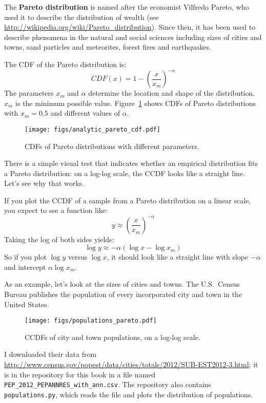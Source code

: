 \documentclass[12pt]{book}
\begin{document}
The {\bf Pareto distribution} is named after the economist Vilfredo Pareto,
who used it to describe the distribution of wealth (see
\url{http://wikipedia.org/wiki/Pareto_distribution}).  Since then, it
has been used to describe phenomena in the natural and social sciences
including sizes of cities and towns, sand particles and meteorites,
forest fires and earthquakes.  

The CDF of the Pareto distribution is:
%
\[ CDF(x) = 1 - \left( \frac{x}{x_m} \right) ^{-\alpha} \]
%
The parameters $x_{m}$ and $\alpha$ determine the location and shape
of the distribution. $x_{m}$ is the minimum possible value.
Figure~\ref{analytic_pareto_cdf} shows CDFs of Pareto
distributions with $x_{m} = 0.5$ and different values
of $\alpha$.

\begin{figure}
\centerline{\texttt{[image: figs/analytic\_pareto\_cdf.pdf]}}
\caption{CDFs of Pareto distributions with different parameters.}
\label{analytic_pareto_cdf}
\end{figure}

There is a simple visual test that indicates whether an empirical
distribution fits a Pareto distribution: on a log-log scale, the CCDF
looks like a straight line.  Let's see why that works.

If you plot the CCDF of a sample from a Pareto distribution on a
linear scale, you expect to see a function like:
%
\[ y \approx \left( \frac{x}{x_m} \right) ^{-\alpha} \]
%
Taking the log of both sides yields:
%
\[ \log y \approx -\alpha (\log x - \log x_{m})\]
%
So if you plot $\log y$ versus $\log x$, it should look like a straight
line with slope $-\alpha$ and intercept
$\alpha \log x_{m}$.

As an example, let's look at the sizes of cities and towns.
The U.S.~Census Bureau publishes the
population of every incorporated city and town in the United States.
 
  

\begin{figure}
\centerline{\texttt{[image: figs/populations\_pareto.pdf]}}
\caption{CCDFs of city and town populations, on a log-log scale.}
\label{populations_pareto}
\end{figure}

I downloaded their data from
\url{http://www.census.gov/popest/data/cities/totals/2012/SUB-EST2012-3.html};
it is in the repository for this book in a file named
\verb"PEP_2012_PEPANNRES_with_ann.csv".  The repository also
contains {\tt populations.py}, which reads the file and plots
the distribution of populations.
\end{document}
